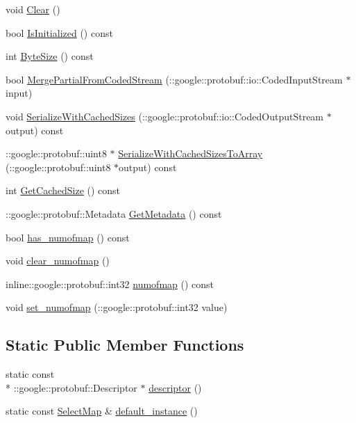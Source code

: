 \begin{DoxyCompactItemize}
\item 
void \hyperlink{class_select_map_a6c74d9780a2f9f3e025ad300bf9f8040}{Clear} ()
\item 
bool \hyperlink{class_select_map_a32ef5cff913db1dff34677313d8fca17}{Is\-Initialized} () const 
\item 
int \hyperlink{class_select_map_a896f4de61429d66f7ca721665252540f}{Byte\-Size} () const 
\item 
bool \hyperlink{class_select_map_ad1efa76b6521f8ec525aa955d4f8cbec}{Merge\-Partial\-From\-Coded\-Stream} (\-::google\-::protobuf\-::io\-::\-Coded\-Input\-Stream $\ast$input)
\item 
void \hyperlink{class_select_map_ad97d14500a1bfbe5d7d762c3a37796c7}{Serialize\-With\-Cached\-Sizes} (\-::google\-::protobuf\-::io\-::\-Coded\-Output\-Stream $\ast$output) const 
\item 
\-::google\-::protobuf\-::uint8 $\ast$ \hyperlink{class_select_map_a7d09c9ffc748072867a1014e3c781292}{Serialize\-With\-Cached\-Sizes\-To\-Array} (\-::google\-::protobuf\-::uint8 $\ast$output) const 
\item 
int \hyperlink{class_select_map_aa228e910522dc2fc1b80e28c3f1fe05c}{Get\-Cached\-Size} () const 
\item 
\-::google\-::protobuf\-::\-Metadata \hyperlink{class_select_map_a6f0e3f4a17b808cfa28f50b761a832dd}{Get\-Metadata} () const 
\item 
bool \hyperlink{class_select_map_acbee86909008218756c875291f41a24c}{has\-\_\-numofmap} () const 
\item 
void \hyperlink{class_select_map_ac7edf514f8e7f66dcc5d8bfbc586cad1}{clear\-\_\-numofmap} ()
\item 
inline\-::google\-::protobuf\-::int32 \hyperlink{class_select_map_a68740fcce2df53fa898d0703cf7d33a7}{numofmap} () const 
\item 
void \hyperlink{class_select_map_aee810901a8840191d4b39ec7d53cb9cb}{set\-\_\-numofmap} (\-::google\-::protobuf\-::int32 value)
\end{DoxyCompactItemize}
\subsection*{Static Public Member Functions}
\begin{DoxyCompactItemize}
\item 
static const \\*
\-::google\-::protobuf\-::\-Descriptor $\ast$ \hyperlink{class_select_map_a58714ef601b494a6f7b53446fd7ae3c4}{descriptor} ()
\item 
static const \hyperlink{class_select_map}{Select\-Map} \& \hyperlink{class_select_map_a33c33429463ad7c416b16e6af042c791}{default\-\_\-instance} ()
\end{DoxyCompactItemize}

